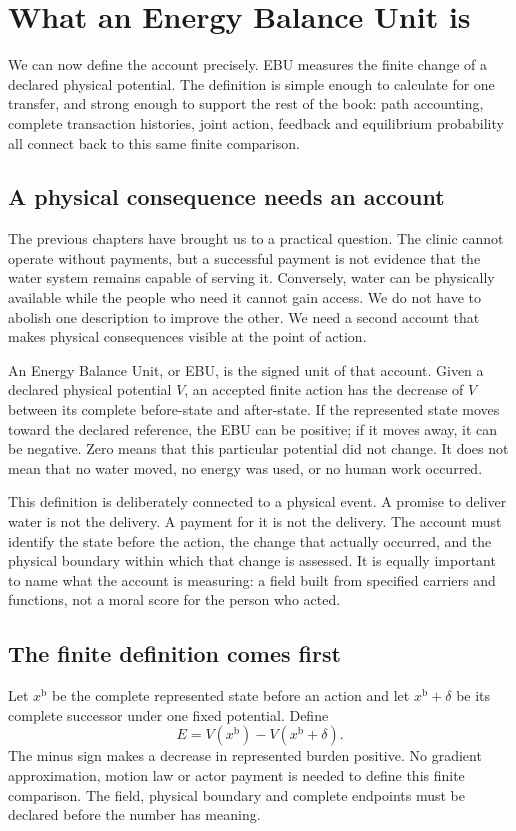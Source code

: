 \chapter{What an Energy Balance Unit is}\label{ch:action}

We can now define the account precisely. EBU measures the finite change of a declared physical potential. The definition is simple enough to calculate for one transfer, and strong enough to support the rest of the book: path accounting, complete transaction histories, joint action, feedback and equilibrium probability all connect back to this same finite comparison.


\section{A physical consequence needs an account}
The previous chapters have brought us to a practical question. The clinic cannot operate without payments, but a successful payment is not evidence that the water system remains capable of serving it. Conversely, water can be physically available while the people who need it cannot gain access. We do not have to abolish one description to improve the other. We need a second account that makes physical consequences visible at the point of action.

An Energy Balance Unit, or EBU, is the signed unit of that account. Given a declared physical potential $V$, an accepted finite action has the decrease of $V$ between its complete before-state and after-state. If the represented state moves toward the declared reference, the EBU can be positive; if it moves away, it can be negative. Zero means that this particular potential did not change. It does not mean that no water moved, no energy was used, or no human work occurred.

This definition is deliberately connected to a physical event. A promise to deliver water is not the delivery. A payment for it is not the delivery. The account must identify the state before the action, the change that actually occurred, and the physical boundary within which that change is assessed. It is equally important to name what the account is measuring: a field built from specified carriers and functions, not a moral score for the person who acted.

\section{The finite definition comes first}
Let $x^{\mathrm{b}}$ be the complete represented state before an action and let $x^{\mathrm{b}}+\delta$ be its complete successor under one fixed potential. Define
\begin{equation}\label{eq:intro-ebu-endpoint}
 E=V(x^{\mathrm{b}})-V(x^{\mathrm{b}}+\delta).
\end{equation}
The minus sign makes a decrease in represented burden positive. No gradient approximation, motion law or actor payment is needed to define this finite comparison. The field, physical boundary and complete endpoints must be declared before the number has meaning.

